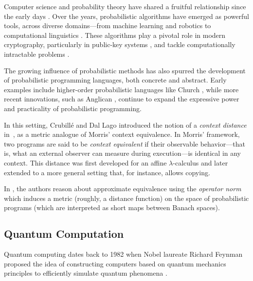 Computer science and probability theory have shared a fruitful relationship since the early days \cite{de1956computability}. Over the years, probabilistic algorithms have emerged as powerful tools, across diverse domains—from machine learning \cite{pearl2014}  and robotics \cite{thrun2002robotic} to computational linguistics \cite{manning1999foundations}. These algorithms play a pivotal role in modern cryptography, particularly in public-key systems \cite{goldwasserProbabilisticEncryption1984}, and tackle computationally intractable  problems \cite{motwaniRandomizedAlgorithms1995}.

The growing influence of probabilistic methods has also spurred the development of probabilistic programming languages, both concrete and abstract. Early examples include higher-order probabilistic languages like Church \cite{Church2008}, while more recent innovations, such as Anglican \cite{Anglican2015}, continue to expand the expressive power and practicality of probabilistic programming.


In this setting, Crubillé and Dal Lago introduced the notion of a \emph{context distance} in~\cite{crubilleMetricReasoningLterms2015,crubilleMetricReasoninglambda2017}, as a metric analogue of Morris' context equivalence. In Morris' framework, two programs are said to be \emph{context equivalent} if their observable behavior---that is, 
what an external observer can measure during execution---is identical in any context.  This distance was first developed for an affine $\lambda$-calculus and later extended to a more general 
setting that, for instance, allows copying.

In \cite{dahlqvist2023syntactic}, the authors reason about approximate equivalence using the \emph{operator norm} which induces a metric (roughly, a distance function) on the space of probabilistic programs (which are interpreted as short maps between Banach spaces).




\subsection*{Quantum Computation}



Quantum computing dates back to 1982 when Nobel laureate Richard Feynman proposed the idea of constructing computers based on quantum mechanics principles to efficiently simulate quantum phenomena \cite{feynman2018simulating}. 

